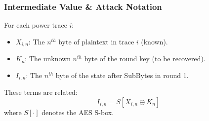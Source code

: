 \begin{frame}
    \frametitle{Intermediate Value \& Attack Notation}

    For each power trace $i$:
    \begin{itemize}
        \item $X_{i,n}$: The $n^{th}$ byte of plaintext in trace $i$ (known).
        \item $K_n$: The unknown $n^{th}$ byte of the round key (to be recovered).
        \item $I_{i,n}$: The $n^{th}$ byte of the state after SubBytes in round 1.
    \end{itemize}
    \begin{block}{}
    These terms are related:
    \[
        I_{i,n} = S[X_{i,n} \oplus K_n]
    \]
    where $S[\cdot]$ denotes the AES S-box.
    \end{block}
\end{frame}


